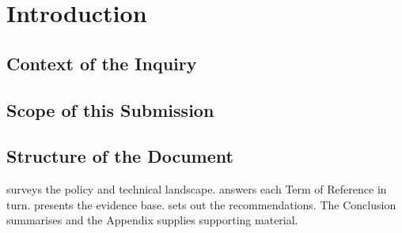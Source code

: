 \chapter{Introduction}
\label{ch:introduction}


\section{Context of the Inquiry}
\label{sec:intro:context}

\lipsum[1-2]

\section{Scope of this Submission}
\label{sec:intro:scope}

\lipsum[3]

\section{Structure of the Document}
\label{sec:intro:structure}

 surveys the policy and technical landscape.  answers each Term of Reference in turn.  presents the evidence base.  sets out the recommendations. The Conclusion summarises and the Appendix supplies supporting material.
